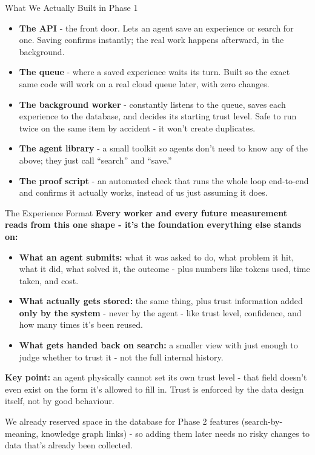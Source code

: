 \documentclass{beamer}
\begin{document}
\begin{frame}{What We Actually Built in Phase 1}
    \begin{itemize}
        \item \textbf{The API} - the front door. Lets an agent save an experience or search for one. Saving confirms instantly; the real work happens afterward, in the background.
        \item \textbf{The queue} - where a saved experience waits its turn. Built so the exact same code will work on a real cloud queue later, with zero changes.
        \item \textbf{The background worker} - constantly listens to the queue, saves each experience to the database, and decides its starting trust level. Safe to run twice on the same item by accident - it won't create duplicates.
        \item \textbf{The agent library} - a small toolkit so agents don't need to know any of the above; they just call ``search'' and ``save.''
        \item \textbf{The proof script} - an automated check that runs the whole loop end-to-end and confirms it actually works, instead of us just assuming it does.
    \end{itemize}
\end{frame}

\begin{frame}{The Experience Format}
\textbf{Every worker and every future measurement reads from this one shape - it's the foundation everything else stands on:}

\begin{itemize}\small
    \item \textbf{What an agent submits:} what it was asked to do, what problem it hit, what it did, what solved it, the outcome - plus numbers like tokens used, time taken, and cost.
    \item \textbf{What actually gets stored:} the same thing, plus trust information added \textbf{only by the system} - never by the agent - like trust level, confidence, and how many times it's been reused.
    \item \textbf{What gets handed back on search:} a smaller view with just enough to judge whether to trust it - not the full internal history.
\end{itemize}

\vspace{0.2cm}
\textbf{Key point:} an agent physically cannot set its own trust level - that field doesn't even exist on the form it's allowed to fill in. Trust is enforced by the data design itself, not by good behaviour.

\vspace{0.15cm}\footnotesize
We already reserved space in the database for Phase 2 features (search-by-meaning, knowledge graph links) - so adding them later needs no risky changes to data that's already been collected.
\end{frame}
\end{document}
